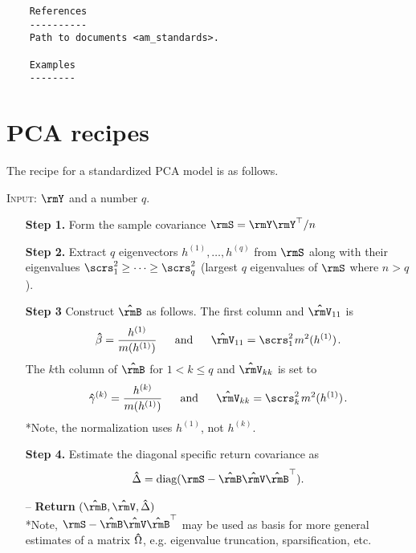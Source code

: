 \documentclass[leqno,12pt]{article}
\begin{document}
{\begin{verbatim}
    References
    ----------
    Path to documents <am_standards>.

    Examples
    --------

\end{verbatim}



\section{PCA recipes} 

The recipe for a standardized PCA model is as follows.

\begin{mdframed}[style=clean]
\textsc{Input:} $\rmY$ and a number $q$.
\begin{itemize}
\item[\bf Step 1.] Form the sample covariance $\rmS =
\rmY \rmY^\top /n$ 
\item[\bf Step 2.] Extract $q$ eigenvectors $h^{(1)},
\dots, h^{(q)}$ from $\rmS$ along with their
eigenvalues $\scrs^2_1 \ge \dots \ge \scrs^2_q$ (largest
$q$ eigenvalues of $\rmS$ where  $n > q$).
\item[\bf Step 3] Construct $\bhat\rmB$ as follows.
The first column and $\bhat{\rmV}_{11}$ is
\begin{align*}
  \bhat{\beta} = \frac{h^{(1)}}{m(h^{(1)})}
  \s[16] \text{and} \s[16]
   \bhat{\rmV}_{11} = \scrs^2_1 \s m^2(h^{(1)}) \s .
\end{align*} 
The $k$th column of $\bhat{\rmB}$ for $1 <k \le q$
and $\bhat{\rmV}_{kk}$
is set to 
\begin{align*}
  \bhat{\gamma}^{(k)} = \frac{h^{(k)}}{m(h^{(1)})}
  \s[16] \text{and} \s[16]
   \bhat{\rmV}_{kk} = \scrs^2_k \s m^2(h^{(1)}) \s .
\end{align*} 
*Note, the normalization uses $h^{(1)}$, not $h^{(k)}$.
\item[\bf Step 4.] 
Estimate the diagonal specific return covariance as
\begin{align*}
  \bhat{\Delta} = \diag( \rmS - \bhat{\rmB} \bhat{\rmV}
  \bhat{\rmB}^\top).
\end{align*}
\item[--] {\bf Return} $(\bhat{\rmB}, \bhat{\rmV},
\bhat{\Delta})$ \\

*Note, $\rmS - \bhat{\rmB} \bhat{\rmV}
  \bhat{\rmB}^\top$ may be used as basis 
for more general estimates of a matrix $\bm{\hat}{\Omega}$,
e.g. eigenvalue truncation, sparsification, etc.
\end{itemize}
\end{mdframed}

}
\end{document}
